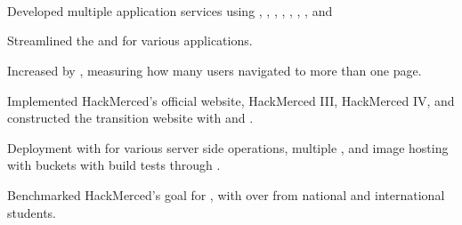 \documentclass[]{hackathons}
\begin{document}
%
%

\begin{minipage}[t]{0.64\textwidth} 

%
%

 \\

\smallbreak
\smallbreak
\smallbreak
\smallbreak
\smallbreak


\section{} 

\vspace{\topsep} %
\begin{tightemize}
\item Developed multiple application services using , , , , , , , and 
\item Streamlined the  and  for various applications.
\item Increased  by , measuring how many users navigated to more than one page.
\end{tightemize}
\medskip

\begin{tightemize}
\item Implemented HackMerced's official website, HackMerced III, HackMerced IV, and constructed the transition website with  and .
\item Deployment with  for various server side operations, multiple , and image hosting with  buckets with build tests through .
\item Benchmarked HackMerced's goal for , with over  from national and international students.
\end{tightemize}
\medskip


\end{minipage}
\end{document}
